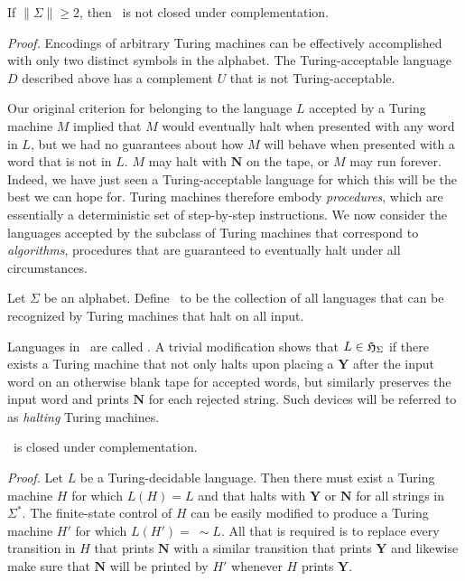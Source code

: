 \begin{thm}\label{thm-12.13}
If $\|\Sigma\|\geq 2$, then \TSIG\ is not closed under complementation.

\emph{Proof.} Encodings of arbitrary Turing machines can be effectively
accomplished with only two distinct symbols in the alphabet. The
Turing-acceptable language $D$ described above has a complement $U$ that is not
Turing-acceptable.
\end{thm}

Our original criterion for belonging to the language $L$ accepted by a Turing
machine $M$ implied that $M$ would eventually halt when presented with any word
in $L$, but we had no guarantees about how $M$ will behave when presented with a
word that is not in $L$. $M$ may halt with $\pmb{N}$ on the tape, or $M$ may run
forever. Indeed, we have just seen a Turing-acceptable language for which this
will be the best we can hope for. Turing machines therefore embody
\emph{procedures}, which are essentially a deterministic set of step-by-step
instructions. We now consider the languages accepted by the subclass of Turing
machines that correspond to \emph{algorithms}, procedures that are guaranteed to
eventually halt under all circumstances.

\begin{dfn}\label{dfn-12.2}
Let $\Sigma$ be an alphabet. Define \HSIG\ to be the collection of all
languages that can be recognized by Turing machines that halt on all input.
\end{dfn}

Languages in \HSIG\ are called \emph{}. A
trivial modification shows that $L\in\mathfrak{H}_\Sigma$ if there exists a Turing machine
that not only halts upon placing a $\pmb{Y}$ after the input word on an
otherwise blank tape for accepted words, but similarly preserves the input word
and prints $\pmb{N}$ for each rejected string. Such devices will be referred to
as \emph{halting} Turing machines.

\begin{thm}\label{thm-12.14}
\HSIG\ is closed under complementation.

\emph{Proof.} Let $L$ be a Turing-decidable language. Then there must exist a
Turing machine $H$ for which $L(H)=L$ and that halts with $\pmb{Y}$ or $\pmb{N}$
for all strings in $\Sigma^*$. The finite-state control of $H$ can be easily
modified to produce a Turing machine $H'$ for which $L(H')=\ \sim  L$. All
that is required is to replace every transition in $H$ that prints $\pmb{N}$
with a similar transition that prints $\pmb{Y}$ and likewise make sure that
$\pmb{N}$ will be printed by $H'$ whenever $H$ prints $\pmb{Y}$.
\end{thm}

